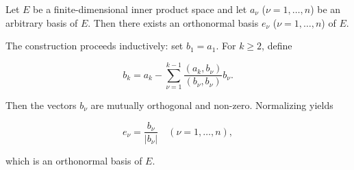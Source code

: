 Let \(E\) be a finite-dimensional inner product space and let \(a_{\nu}\) (\(\nu = 1, \ldots, n\)) be an arbitrary basis of \(E\). Then there exists an orthonormal basis \(e_{\nu}\) (\(\nu = 1, \ldots, n\)) of \(E\).

The construction proceeds inductively: set \(b_1 = a_1\). For \(k \geq 2\), define

$$b_k = a_k - \sum_{\nu=1}^{k-1} \frac{(a_k, b_{\nu})}{(b_{\nu}, b_{\nu})} b_{\nu}.$$

Then the vectors \(b_{\nu}\) are mutually orthogonal and non-zero. Normalizing yields

$$e_{\nu} = \frac{b_{\nu}}{|b_{\nu}|} \quad (\nu = 1, \ldots, n),$$

which is an orthonormal basis of \(E\).
